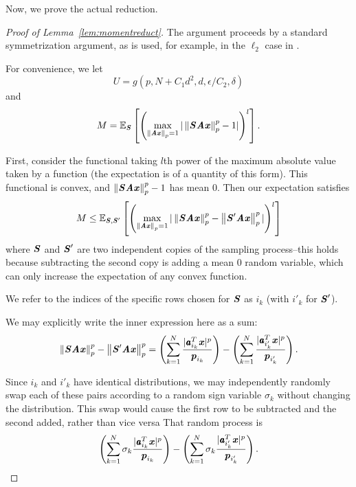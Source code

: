Now, we prove the actual reduction.
\begin{proof}[Proof of Lemma~\ref{lem:momentreduct}]
The argument proceeds by a standard symmetrization argument, as is used, for example, in the $\ell_2$ case in
\cite{RudelsonV07}.

For convenience, we let
\begin{equation*}
U = g(p, N + C_1 d^2, d, \epsilon / C_2, \delta)
\end{equation*}
and
\begin{equation*}
M = {\mathbb{E}}_{\boldsymbol{\mathit{S}}}\left[ \left ( \max_{\left\| \boldsymbol{\mathit{A}} \boldsymbol{\mathit{x}} \right\|_p = 1} | \left\| \boldsymbol{\mathit{S}} \boldsymbol{\mathit{A}} \boldsymbol{\mathit{x}} \right\|_p^p - 1 | \right )^l \right].
\end{equation*}

First, consider the functional taking $l$th power of the maximum absolute value taken by a function
(the expectation is of a quantity of this form).  This functional is convex, and
$\left\| \boldsymbol{\mathit{S}} \boldsymbol{\mathit{A}} \boldsymbol{\mathit{x}} \right\|_p^p - 1$ has mean 0.  Then our expectation satisfies
\begin{equation*}
M \leq {\mathbb{E}}_{\boldsymbol{\mathit{S}},\boldsymbol{\mathit{S}}'}\left[ \left ( \max_{\left\| \boldsymbol{\mathit{A}} \boldsymbol{\mathit{x}} \right\|_p = 1} | \left\| \boldsymbol{\mathit{S}} \boldsymbol{\mathit{A}} \boldsymbol{\mathit{x}} \right\|_p^p - \left\| \boldsymbol{\mathit{S}}' \boldsymbol{\mathit{A}} \boldsymbol{\mathit{x}} \right\|_p^p | \right )^l \right]
\end{equation*}
where $\boldsymbol{\mathit{S}}$ and $\boldsymbol{\mathit{S}}'$ are two independent copies of the sampling process--this holds because subtracting the second copy is
adding a mean 0 random variable, which can only increase the expectation of any convex function.

We refer to the indices of the specific rows chosen for $\boldsymbol{\mathit{S}}$ as $i_k$ (with $i'_k$ for $\boldsymbol{\mathit{S}}'$).

We may explicitly write the inner expression here as a sum:
\begin{equation*}
\left\| \boldsymbol{\mathit{S}} \boldsymbol{\mathit{A}} \boldsymbol{\mathit{x}} \right\|_p^p - \left\| \boldsymbol{\mathit{S}}' \boldsymbol{\mathit{A}} \boldsymbol{\mathit{x}} \right\|_p^p = \left ( \sum_{k=1}^N \frac{|\pmb{\mathit{a}}_{i_k}^T \boldsymbol{\mathit{x}}|^p}{\boldsymbol{\mathit{p}}_{i_k}} \right ) - \left ( \sum_{k=1}^N \frac{|\pmb{\mathit{a}}_{i'_k}^T \boldsymbol{\mathit{x}}|^p}{\boldsymbol{\mathit{p}}_{i'_k}} \right ).
\end{equation*}

Since $i_k$ and $i'_k$ have identical distributions, we may independently randomly swap each of these pairs according to a random sign variable $\sigma_k$ without changing the distribution.
This swap would cause the first row to be subtracted and the second added, rather than vice versa
That random process is
\begin{equation*}
\left ( \sum_{k=1}^N \sigma_k \frac{|\pmb{\mathit{a}}_{i_k}^T \boldsymbol{\mathit{x}}|^p}{\boldsymbol{\mathit{p}}_{i_k}} \right ) - \left ( \sum_{k=1}^N \sigma_k \frac{|\pmb{\mathit{a}}_{i'_k}^T \boldsymbol{\mathit{x}}|^p}{\boldsymbol{\mathit{p}}_{i'_k}} \right ).
\end{equation*}


\end{proof}
